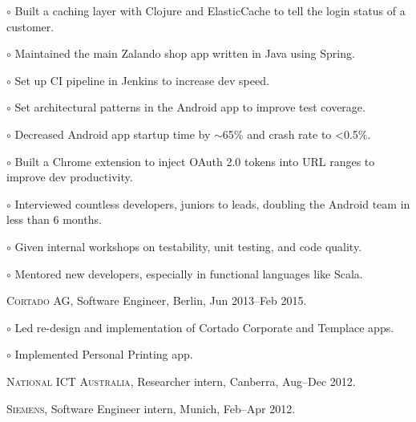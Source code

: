 \documentclass[letterpaper]{article}
\renewenvironment{itemize}{
  \begin{list}{}{
    \setlength{\leftmargin}{1.5em}
  }
}{
  \end{list}
}
\newenvironment{no-indent-itemize}{
  \begin{list}{}{
    \setlength{\leftmargin}{0em}
  }
}{
  \end{list}
}
\def\tilde{$\scriptstyle\sim$}
\def\bullet{$\circ$\xspace}
\begin{document}
\begin{no-indent-itemize}
\begin{itemize}
    \item\bullet Built a caching layer with Clojure and ElasticCache to tell the login status of a customer.
    \item\bullet Maintained the main Zalando shop app written in Java using Spring.
    \item\bullet Set up CI pipeline in Jenkins to increase dev speed.
    \item\bullet Set architectural patterns in the Android app to improve test coverage.
    \item\bullet Decreased Android app startup time by \tilde 65\% and crash rate to <0.5\%.
    \item\bullet Built a Chrome extension to inject OAuth 2.0 tokens into URL ranges to improve dev productivity.
    \item\bullet Interviewed countless developers, juniors to leads, doubling the Android team in less than 6 months.
    \item\bullet Given internal workshops on testability, unit testing, and code quality.
    \item\bullet Mentored new developers, especially in functional languages like Scala.
  \end{itemize}
  \item \textsc{Cortado AG}, Software Engineer, Berlin, Jun 2013--Feb 2015.
  \begin{itemize}
    \item\bullet Led re-design and implementation of Cortado Corporate and Templace apps.
    \item\bullet Implemented Personal Printing app.
  \end{itemize}
  \item \textsc{National ICT Australia}, Researcher intern, Canberra, Aug--Dec 2012. 
  \item \textsc{Siemens}, Software Engineer intern, Munich, Feb--Apr 2012.

\end{no-indent-itemize}
\end{document}
